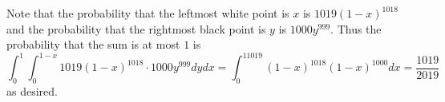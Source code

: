 Note that the probability that the leftmost white point is $x$ is $1019\left(1-x\right)^{1018}$ and the probability that the rightmost black point is $y$ is $1000y^{999}$. Thus the probability that the sum is at most $1$ is \[\displaystyle\int_0^1\displaystyle\int_0^{1-x}1019\left(1-x\right)^{1018}\cdot1000y^{999}dydx=\displaystyle\int_0^11019\left(1-x\right)^{1018}\left(1-x\right)^{1000}dx=\boxed{\frac{1019}{2019}}\] as desired.